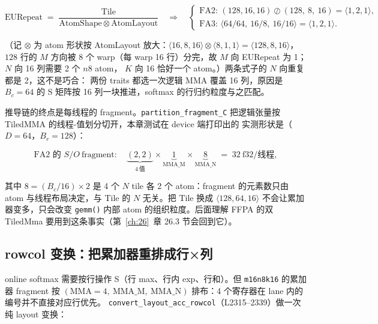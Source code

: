 \begin{equation}
  \mathrm{EURepeat} \;=\; \frac{\mathrm{Tile}}{\mathrm{AtomShape}\otimes \mathrm{AtomLayout}}
  \quad\Longrightarrow\quad
  \begin{cases}
    \text{FA2: } (128,16,16)\oslash(128,\ 8,\ 16) = \langle 1,2,1\rangle,\\[2pt]
    \text{FA3: } \langle 64/64,\ 16/8,\ 16/16\rangle = \langle 1,2,1\rangle .
  \end{cases}
  \label{eq:25-eurepeat}
\end{equation}

（记 $\otimes$ 为 atom 形状按 AtomLayout 放大：$\langle16,8,16\rangle\otimes
\langle8,1,1\rangle=\langle128,8,16\rangle$，$128$ 行的 $M$ 方向被 8 个
warp（每 warp 16 行）分完，故 $M$ 向 EURepeat 为 1；$N$ 向 16 列需要 2 个 $n8$ atom，
$K$ 向 16 恰好一个 atom。）两条式子的 $N$ 向重复都是 2，这不是巧合：
两份 traits 都选一次逻辑 MMA 覆盖 16 列，原因是 $B_c=64$ 的
S 矩阵按 16 列一块推进，softmax 的行归约粒度与之匹配。

推导链的终点是每线程的 fragment。\texttt{partition\_\allowbreak{}fragment\_\allowbreak{}C}
把逻辑张量按 TiledMMA 的线程-值划分切开，本章测试在 device 端打印出的
实测形状是（$D{=}64$，$B_r{=}128$）：

\begin{equation}
  \text{FA2 的 } S/O\ \text{fragment}:\quad
  \underbrace{(2,2)}_{4\ \text{值}}\times\underbrace{1}_{\text{MMA\_M}}
  \times\underbrace{8}_{\text{MMA\_N}} \;=\; 32\ \text{f32/线程},
  \label{eq:25-frag}
\end{equation}

其中 $8 = (B_c/16)\times 2$ 是 4 个 $N$ tile 各 2 个 atom：fragment 的元素数只由
atom 与线程布局决定，与 Tile 的 $N$ 无关。把 Tile 换成
$\langle128,64,16\rangle$ 不会让累加器变多，只会改变 \texttt{gemm()} 内部 atom
的组织粒度。后面理解 FFPA 的双 TiledMma 要用到这条事实（第~\ref{ch:26}~章 26.3 节会回到它）。

\subsection{rowcol 变换：把累加器重排成行×列}

online softmax 需要按行操作 S（行 max、行内 exp、行和）。但
\texttt{m16n8k16} 的累加器 fragment 按 $(\mathrm{MMA}=4,\ \mathrm{MMA\_M},\
\mathrm{MMA\_N})$ 排布：4 个寄存器在 lane 内的编号并不直接对应行优先。
\texttt{convert\_\allowbreak{}layout\_\allowbreak{}acc\_\allowbreak{}rowcol}（L2315--2339）做一次纯 layout 变换：

